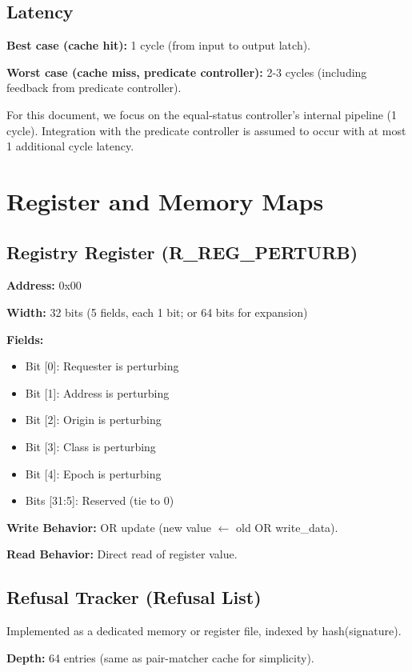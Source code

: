 \documentclass[11pt,oneside]{article}
\begin{document}
\subsection{Latency}

\textbf{Best case (cache hit):} 1 cycle (from input to output latch).

\textbf{Worst case (cache miss, predicate controller):} 2-3 cycles (including feedback from predicate controller).

For this document, we focus on the equal-status controller's internal pipeline (1 cycle). Integration with the predicate controller is assumed to occur with at most 1 additional cycle latency.

\section{Register and Memory Maps}

\subsection{Registry Register (R\_REG\_PERTURB)}

\textbf{Address:} 0x00

\textbf{Width:} 32 bits (5 fields, each 1 bit; or 64 bits for expansion)

\textbf{Fields:}
\begin{itemize}
\item Bit [0]: Requester is perturbing
\item Bit [1]: Address is perturbing
\item Bit [2]: Origin is perturbing
\item Bit [3]: Class is perturbing
\item Bit [4]: Epoch is perturbing
\item Bits [31:5]: Reserved (tie to 0)
\end{itemize}

\textbf{Write Behavior:} OR update (new value $\gets$ old OR write\_data).

\textbf{Read Behavior:} Direct read of register value.

\subsection{Refusal Tracker (Refusal List)}

Implemented as a dedicated memory or register file, indexed by hash(signature).

\textbf{Depth:} 64 entries (same as pair-matcher cache for simplicity).
\end{document}
